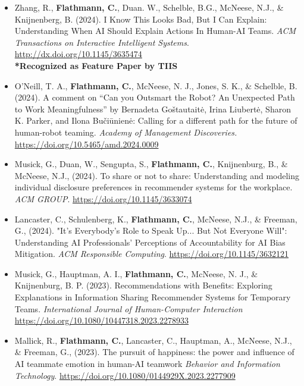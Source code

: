 \begin{itemize}[align=left, labelwidth=3em,]
\item[\faTrophy JA.16] Zhang, R., \textbf{Flathmann, C.}, Duan. W., Schelble, B.G., McNeese, N.J., \& Knijnenberg, B. (2024). I Know This Looks Bad, But I Can Explain: Understanding When AI Should Explain Actions In Human-AI Teams. \textit{ACM Transactions on Interactive Intelligent Systems}. \url{http://dx.doi.org/10.1145/3635474} \\\textbf{*Recognized as Feature Paper by TIIS}\\

\item[JA.15] O’Neill, T. A., \textbf{Flathmann, C.}, McNeese, N. J., Jones, S. K., \& Schelble, B. (2024). A comment on “Can you Outsmart the Robot? An Unexpected Path to Work Meaningfulness” by Bernadeta Goštautaitė, Irina Liubertė, Sharon K. Parker, and Ilona Bučiūnienė: Calling for a different path for the future of human-robot teaming. \textit{Academy of Management Discoveries.} \url{https://doi.org/10.5465/amd.2024.0009}\\

\item[JA.14] Musick, G., Duan, W., Sengupta, S., \textbf{Flathmann, C.}, Knijnenburg, B., \& McNeese, N.J., (2024). To share or not to share: Understanding and modeling individual disclosure preferences in recommender systems for the workplace. \textit{ACM GROUP}. \url{https://doi.org/10.1145/3633074}\\

\item[JA.13] Lancaster, C., Schulenberg, K., \textbf{Flathmann, C.}, McNeese, N.J., \& Freeman, G., (2024). "It's Everybody's Role to Speak Up... But Not Everyone Will": Understanding AI Professionals' Perceptions of Accountability for AI Bias Mitigation. \textit{ACM Responsible Computing}. \url{https://doi.org/10.1145/3632121}\\

\item[JA.12] Musick, G., Hauptman, A. I., \textbf{Flathmann, C.}, McNeese, N. J., \& Knijnenburg, B. P. (2023). Recommendations with Benefits: Exploring Explanations in Information Sharing Recommender Systems for Temporary Teams. \textit{International Journal of Human-Computer Interaction} \url{https://doi.org/10.1080/10447318.2023.2278933}\\

\item[JA.11] Mallick, R., \textbf{Flathmann, C.}, Lancaster, C., Hauptman, A., McNeese, N.J., \& Freeman, G., (2023). The pursuit of happiness: the power and influence of AI teammate emotion in human-AI teamwork \textit{Behavior and Information Technology}. \url{https://doi.org/10.1080/0144929X.2023.2277909}\\


\end{itemize}
